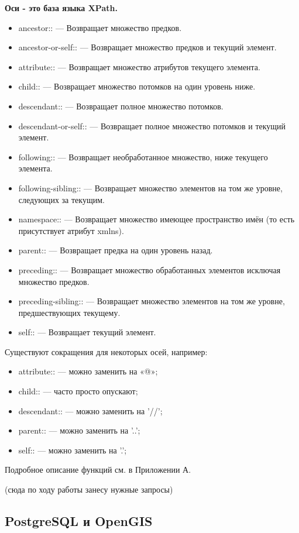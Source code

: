 \documentclass[12pt,a4paper,oneside]{article} %
\begin{document}
\textbf{Оси - это база языка XPath.}
\begin{itemize}
\item ancestor:: — Возвращает множество предков.
\item ancestor-or-self:: — Возвращает множество предков и текущий элемент.
\item attribute:: — Возвращает множество атрибутов текущего элемента.
\item child:: — Возвращает множество потомков на один уровень ниже.
\item descendant:: — Возвращает полное множество потомков.
\item descendant-or-self:: — Возвращает полное множество потомков и текущий элемент.
\item following:: — Возвращает необработанное множество, ниже текущего элемента.
\item following-sibling:: — Возвращает множество элементов на том же уровне, следующих за текущим.
\item namespace:: — Возвращает множество имеющее пространство имён (то есть присутствует атрибут xmlns).
\item parent:: — Возвращает предка на один уровень назад.
\item preceding:: — Возвращает множество обработанных элементов исключая множество предков.
\item preceding-sibling:: — Возвращает множество элементов на том же уровне, предшествующих текущему.
\item self:: — Возвращает текущий элемент.
\end{itemize}

Существуют сокращения для некоторых осей, например:
\begin{itemize}
\item attribute:: — можно заменить на «@»;
\item child:: — часто просто опускают;
\item descendant:: — можно заменить на '//';
\item parent:: — можно заменить на '..';
\item self:: — можно заменить на '.';
\end{itemize}

Подробное описание функций см. в Приложении А.

(сюда по ходу работы занесу нужные запросы)

\newpage
\subsection{PostgreSQL и OpenGIS}
\end{document}
